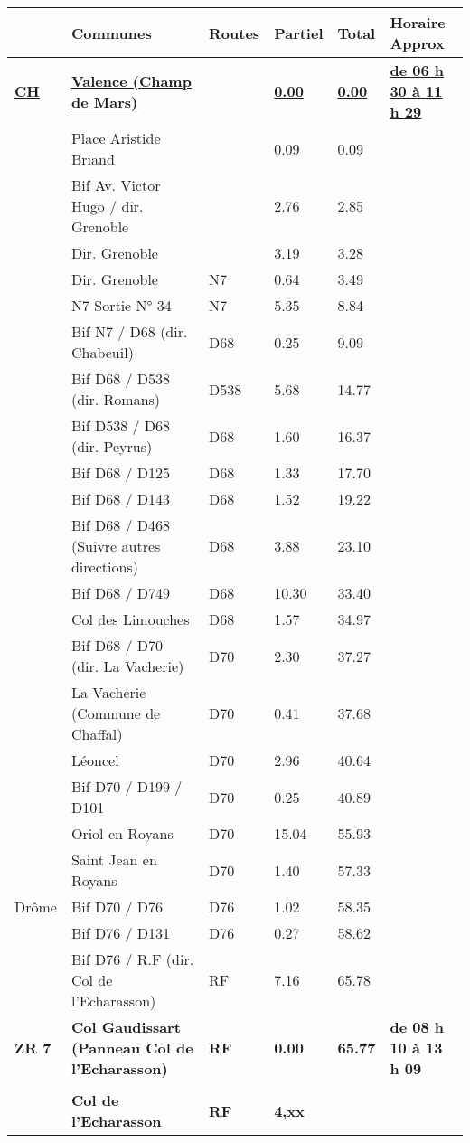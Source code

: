 \documentclass{article}%
\begin{document}
\begin{longtable}{p{2.25cm}|p{6.7cm}|p{2.0cm}|p{1.5cm}|p{1.5cm}|p{3.5cm}}%
\hline%
&Communes&Routes&Partiel&Total&Horaire Approx\\%
\hline%
\endhead%
\endfoot%
\endlastfoot%
\textbf{\underline{﻿CH}}&\textbf{\underline{Valence (Champ de Mars)}}& &\textbf{\underline{0.00}}&\textbf{\underline{0.00}}&\textbf{\underline{de 06 h 30 à 11 h 29}}\\%
 &Place Aristide Briand & &0.09&0.09& \\%
 &Bif Av. Victor Hugo / dir. Grenoble& &2.76&2.85& \\%
 &Dir. Grenoble& &3.19&3.28& \\%
 &Dir. Grenoble&N7&0.64&3.49& \\%
 &N7  Sortie N° 34&N7&5.35&8.84& \\%
 &Bif N7 / D68 (dir. Chabeuil)&D68&0.25&9.09& \\%
 &Bif D68 / D538 (dir. Romans)&D538&5.68&14.77& \\%
 &Bif D538 / D68 (dir. Peyrus)&D68&1.60&16.37& \\%
 &Bif D68 / D125&D68&1.33&17.70& \\%
 &Bif D68 / D143&D68&1.52&19.22& \\%
 &Bif D68 / D468 (Suivre autres directions)&D68&3.88&23.10& \\%
 &Bif D68 / D749&D68&10.30&33.40& \\%
 &Col des Limouches&D68&1.57&34.97& \\%
 &Bif D68 / D70 (dir. La Vacherie)&D70 &2.30&37.27& \\%
 &La Vacherie (Commune de Chaffal)&D70&0.41&37.68& \\%
 &Léoncel &D70 &2.96&40.64& \\%
 &Bif D70 / D199 / D101&D70&0.25&40.89& \\%
 &Oriol en Royans&D70 &15.04&55.93& \\%
 &Saint Jean en Royans  &D70&1.40&57.33& \\%
Drôme&Bif D70 / D76&D76&1.02&58.35& \\%
 &Bif D76 / D131&D76&0.27&58.62& \\%
 &Bif D76 / R.F (dir. Col de l'Echarasson)&RF&7.16&65.78& \\%
\textbf{ ZR 7    }&\textbf{Col Gaudissart (Panneau Col de l'Echarasson)}&\textbf{RF}&\textbf{0.00}&\textbf{65.77}&\textbf{de 08 h 10 à 13 h 09}\\%
 & & & & & \\%
 &\textbf{Col de l’Echarasson}&\textbf{RF}&\textbf{4,xx}& & \\%

\end{longtable}
\end{document}
